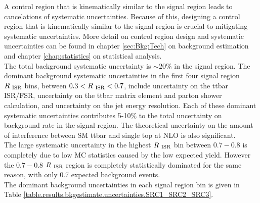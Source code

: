 \indent A control region that is kinematically similar to the signal region leads to cancelations of systematic uncertainties.  Because of this, designing a control region that is kinematically similar to the signal region is crucial to mitigating systematic uncertainties.  More detail on control region design and systematic uncertainties can be found in chapter \ref{sec:Bkg:Tech} on background estimation and chapter \ref{chap:statistics} on statistical analysis.  \\



\indent The total background systematic uncertainty is $\sim20\%$ in the signal region.  The dominant background systematic uncertainties in the first four signal region $R_{~\mathrm{ISR}}$ bins, between $0.3 < R_{~\mathrm{ISR}} < 0.7$, include uncertainty on the ttbar ISR/FSR, uncertainty on the ttbar matrix element and parton shower calculation, and uncertainty on the jet energy resolution.  Each of these dominant systematic uncertainties contributes 5-10\% to the total uncertainty on background rate in the signal region.  The theoretical uncertainty on the amount of interference between SM ttbar and single top at NLO is also significant.  \\

\indent The large systematic uncertainty in the highest $R_{~\mathrm{ISR}}$ bin between $0.7-0.8$ is completely due to low MC statistics caused by the low expected yield.  However the $0.7-0.8$ $R_{~\mathrm{ISR}}$ region is completely statistically dominated for the same reason, with only 0.7 expected background events.  \\

\indent The dominant background uncertainties in each signal region bin is given in Table \ref{table.results.bkgestimate.uncertainties.SRC1_SRC2_SRC3}. \\%

